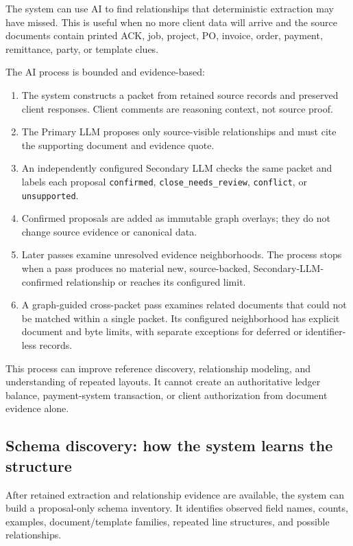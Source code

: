 \documentclass[
]{article}
\providecommand{\tightlist}{%
  \setlength{\itemsep}{0pt}\setlength{\parskip}{0pt}}
\begin{document}
The system can use AI to find relationships that deterministic
extraction may have missed. This is useful when no more client data will
arrive and the source documents contain printed ACK, job, project, PO,
invoice, order, payment, remittance, party, or template clues.

The AI process is bounded and evidence-based:

\begin{enumerate}
\def\labelenumi{\arabic{enumi}.}
\tightlist
\item
  The system constructs a packet from retained source records and
  preserved client responses. Client comments are reasoning context, not
  source proof.
\item
  The Primary LLM proposes only source-visible relationships and must
  cite the supporting document and evidence quote.
\item
  An independently configured Secondary LLM checks the same packet and
  labels each proposal \texttt{confirmed},
  \texttt{close\_\allowbreak{}needs\_\allowbreak{}review},
  \texttt{conflict}, or \texttt{unsupported}.
\item
  Confirmed proposals are added as immutable graph overlays; they do not
  change source evidence or canonical data.
\item
  Later passes examine unresolved evidence neighborhoods. The process
  stops when a pass produces no material new, source-backed,
  Secondary-LLM-confirmed relationship or reaches its configured limit.
\item
  A graph-guided cross-packet pass examines related documents that could
  not be matched within a single packet. Its configured neighborhood has
  explicit document and byte limits, with separate exceptions for
  deferred or identifier-less records.
\end{enumerate}

This process can improve reference discovery, relationship modeling, and
understanding of repeated layouts. It cannot create an authoritative
ledger balance, payment-system transaction, or client authorization from
document evidence alone.

\subsection{Schema discovery: how the system learns the
structure}\label{schema-discovery-how-the-system-learns-the-structure}

After retained extraction and relationship evidence are available, the
system can build a proposal-only schema inventory. It identifies
observed field names, counts, examples, document/template families,
repeated line structures, and possible relationships.
\end{document}

